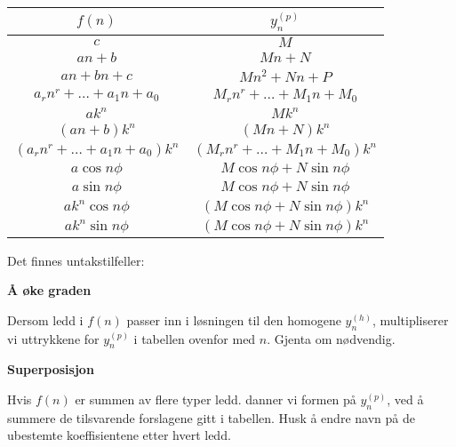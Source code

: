 \documentclass[11pt]{article}
\theoremstyle{definition}
\theoremstyle{definition}
\theoremstyle{definition}
\theoremstyle{definition}
\theoremstyle{definition}
\theoremstyle{definition}
\begin{document}
		\def\arraystretch{2.5}%
		\begin{table}[!ht]
			\centering
			\label{my-label}
			\begin{tabular}{c c}
				
				\underline{\(f(n)\) } &  \underline{\(y_n^{(p)}\)}                          \\ \hline
				\(c\)       & \(M\)                         \\ \hline
				\(an+b \)          & \(Mn+N\)                              \\ \hline
				\(an+bn+c \)          & \(Mn^2+Nn+P\)                                 \\ \hline
				\(a_rn^r+\ldots + a_1n+a_0 \)   & \(M_rn^r+\ldots + M_1n+M_0\)                                \\ \hline
				\(ak^n \)   & \(Mk^n\)                                \\ \hline
				\((an+b)k^n \)   & \((Mn+N)k^n \)                                \\ \hline
				\((a_rn^r+\ldots + a_1n+a_0)k^n \)   & \((M_rn^r+\ldots + M_1n+M_0)k^n\)  \\ \hline
				\(a\cos{n\phi} \)          & \(M\cos{n\phi}+N\sin{n\phi} \)          \\ \hline
				\(a\sin{n\phi} \)        &        \(M\cos{n\phi}+N\sin{n\phi} \)          \\ \hline
				\(ak^n\cos{n\phi} \)   & \((M\cos{n\phi}+N\sin{n\phi})k^n \)                     \\ \hline
				\(ak^n\sin{n\phi} \)  & \((M\cos{n\phi}+N\sin{n\phi})k^n \)   \\ \hline
			\end{tabular}
		\end{table}
		
		\def\arraystretch{1}%
		\newpage
		
		Det finnes untakstilfeller:
		
		\textbf{Å øke graden}
		
		Dersom ledd i \(f(n)\) passer inn i løsningen til den homogene \(y_n^{(h)}\), multipliserer vi uttrykkene for \(y_n^{(p)} \) i tabellen ovenfor med \(n\). Gjenta om nødvendig.
		
		\textbf{Superposisjon}
		
	    Hvis \(f(n)\) er summen av flere typer ledd. danner vi formen på \(y_n^{(p)}\), ved å summere de tilsvarende forslagene gitt i tabellen. Husk å endre navn på de ubestemte koeffisientene etter hvert ledd. 
        
\end{document}
